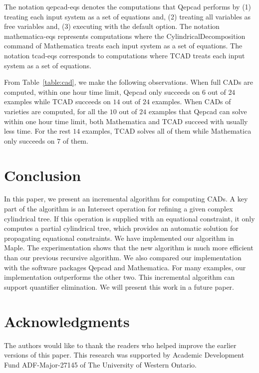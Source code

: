 \documentclass[10pt]{article}
\newcommand{\TCAD}{{\sc TCAD}}
\newcommand{\CAD}{{CAD}}
\newcommand{\QEPCAD}{{\sc Qepcad}}
\begin{document}
The notation qepcad-eqs denotes the computations 
that {\QEPCAD} performs by (1) treating each input system as a set of 
equations and, (2) treating all variables as free 
variables and, (3) executing with the default option.
The notation mathematica-eqs represents
computations where the {\sf CylindricalDecomposition} command 
of {\sf Mathematica} treats each input system as a set of equations.
The notation tcad-eqs corresponds to  computations where {\TCAD}
treats each input system as a set of equations.

From Table~\ref{table:cad}, we make the following observations.
When full {\CAD}s are computed, within one hour time limit, 
{\QEPCAD} only succeeds on $6$ out of $24$ examples while
{\TCAD} succeeds on $14$ out of $24$ examples. 
When {\CAD}s of varieties are computed, 
for all the $10$ out of $24$ examples that {\QEPCAD}
can solve within one hour time limit, 
both {\sf Mathematica} and {\sf TCAD}
succeed with usually less time. 
For the rest $14$ examples, {\sf TCAD}
solves all of them while {\sf Mathematica} 
only succeeds on $7$ of them.


\section{Conclusion}
In this paper, we present an incremental algorithm for computing CADs.
A key part of the algorithm is an {\sf Intersect} 
operation for refining a given complex cylindrical tree. 
If this operation is supplied with an equational constraint,
it only computes a partial cylindrical tree, which 
provides an automatic solution for propagating equational constraints.
We have implemented our algorithm in {\sc Maple}. 
The experimentation 
shows that the new algorithm is much more efficient than
our previous recursive algorithm. 
We also compared our implementation with the software packages 
{\QEPCAD} and {\sf Mathematica}. 
For many examples, our implementation outperforms the other two. 
This incremental algorithm can support quantifier elimination. 
We will present this work in a future paper.

\section*{Acknowledgments} 
The authors would like to thank the
readers who helped improve the earlier versions 
of this paper.
This research was supported by 
Academic Development Fund ADF-Major-27145
of The University of Western Ontario.
\end{document}
